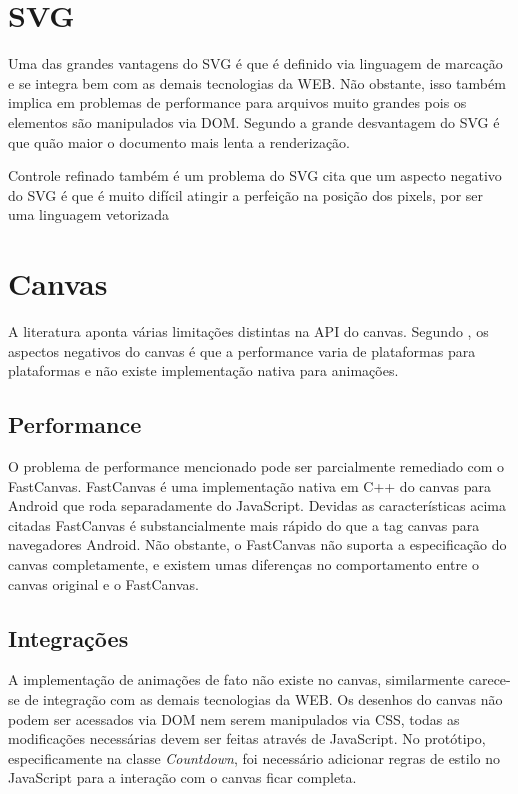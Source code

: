 \section{SVG}

Uma das grandes vantagens do SVG é que é definido via linguagem de
marcação e se integra bem com as demais tecnologias da WEB. Não
obstante, isso também implica em problemas de performance para arquivos
muito grandes pois os elementos são manipulados via DOM. Segundo
\citet{html5mostwanted} a grande desvantagem do SVG é que quão maior o
documento mais lenta a renderização.

Controle refinado também é um problema do SVG \citet{html5mostwanted}
cita que um aspecto negativo do SVG é que é muito difícil atingir a
perfeição na posição dos pixels, por ser uma linguagem vetorizada

\section{Canvas}

A literatura aponta várias limitações distintas na API do canvas.
Segundo \autocite{html5mostwanted}, os aspectos negativos do canvas é
que a performance varia de plataformas para plataformas e não existe
implementação nativa para animações.

\subsection{Performance}

O problema de performance mencionado pode ser parcialmente remediado
com o FastCanvas. FastCanvas é uma implementação nativa em C++ do
canvas para Android que roda separadamente do JavaScript. Devidas as
características acima citadas FastCanvas é substancialmente mais
rápido do que a tag canvas para navegadores Android. Não obstante, o
FastCanvas não suporta a especificação do canvas completamente, e
existem umas diferenças no comportamento entre o canvas original e o
FastCanvas.

\subsection{Integrações}

A implementação de animações de fato não existe no canvas,
similarmente carece-se de integração com as demais tecnologias
da WEB. Os desenhos do canvas não podem ser acessados via DOM nem
serem manipulados via CSS, todas as modificações necessárias devem
ser feitas através de JavaScript.
No protótipo, especificamente na classe \textit{Countdown}, foi necessário
adicionar regras de estilo no JavaScript para a interação com o canvas
ficar completa.

